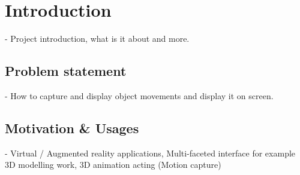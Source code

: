 \section{Introduction}

- Project introduction, what is it about and more.

\subsection{Problem statement}
- How to capture and display object movements and display it on screen.

\subsection{Motivation \& Usages}
- Virtual / Augmented reality applications, Multi-faceted interface for example 3D modelling work, 3D animation acting (Motion capture)
